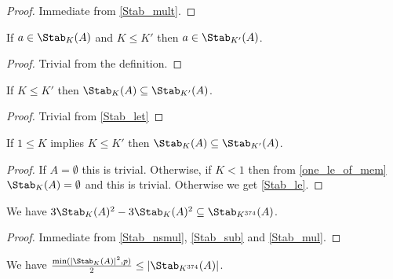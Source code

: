 \begin{proof}
    \leanok
    Immediate from \ref{Stab_mult}.
\end{proof}

\begin{lemma}
    \label{Stab_let}
    \leanok
    If $a \in \Stab_K(A)$ and $K \leq K'$ then $a \in \Stab_{K'}(A)$.
\end{lemma}

\begin{proof}
    \leanok
    Trivial from the definition.
\end{proof}

\begin{lemma}
    \label{Stab_le}
    \leanok
    If $K \leq K'$ then $\Stab_K(A) \subseteq \Stab_{K'}(A)$.
\end{lemma}

\begin{proof}
    \leanok
    Trivial from \ref{Stab_let}
\end{proof}

\begin{lemma}
    \label{Stab_le_2}
    \leanok
    If $1 \leq K$ implies $K \leq K'$ then $\Stab_K(A) \subseteq \Stab_{K'}(A)$.
\end{lemma}

\begin{proof}
    \leanok
    If $A = \emptyset$ this is trivial.
    Otherwise, if $K < 1$ then from \ref{one_le_of_mem} $\Stab_K(A) = \emptyset$ and this is trivial.
    Otherwise we get \ref{Stab_le}.
\end{proof}

\begin{lemma}
    \label{Stab_subset}
    \leanok
    We have $3 \Stab_K(A)^2 - 3 \Stab_K(A)^2 \subseteq \Stab_{K^{374}}(A)$.
\end{lemma}

\begin{proof}
    \leanok
    Immediate from \ref{Stab_nsmul}, \ref{Stab_sub} and \ref{Stab_mul}.
\end{proof}

\begin{lemma}
    \label{Stab_card_inc}
    \leanok
    We have $\frac{\min(|\Stab_K(A)|^2, p)}2 \leq |\Stab_{K^{374}}(A)|$.
\end{lemma}

